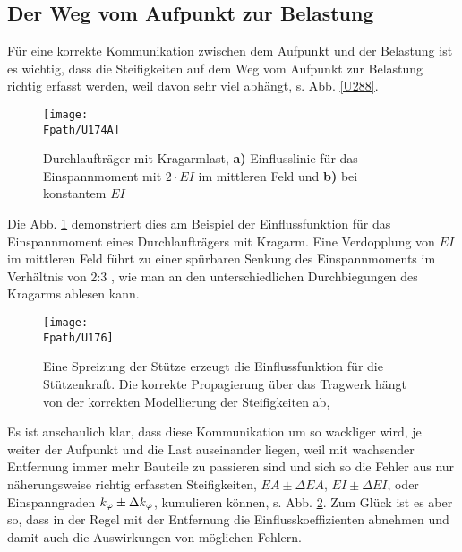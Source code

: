 {\textcolor{sectionTitleBlue}{\section{Der Weg vom Aufpunkt zur Belastung}}}
F\"{u}r eine korrekte Kommunikation zwischen dem Aufpunkt und der Belas\-tung ist es wichtig, dass die Steifigkeiten auf dem Weg vom Aufpunkt zur Belastung richtig erfasst werden, weil davon sehr viel abh\"{a}ngt, s. Abb. \ref{U288}.
\begin{figure}
\centering
\if {} \sidecaption \fi
\texttt{[image: \\Fpath/U174A]}
\caption{Durchlauftr\"{a}ger mit Kragarmlast, \textbf{ a)} Einflusslinie f\"{u}r das Einspannmoment mit $2 \cdot EI$ im mittleren Feld  und \textbf{ b)} bei konstantem $EI$}
\label{U174}%
\end{figure}%

Die Abb. \ref{U174} demonstriert dies am Beispiel der Einflussfunktion f\"{u}r das Einspannmoment eines Durchlauftr\"{a}gers mit Kragarm. Eine Verdopplung von $EI$ im mittleren Feld f\"{u}hrt zu einer sp\"{u}rbaren Senkung des Einspannmoments im Verh\"{a}ltnis von 2:3 , wie man an den unterschiedlichen Durchbiegungen des Kragarms ablesen kann.
\begin{figure}
\centering
\if {} \sidecaption \fi
\texttt{[image: \\Fpath/U176]}
\caption{Eine Spreizung der St\"{u}tze erzeugt die Einflussfunktion f\"{u}r die St\"{u}tzenkraft. Die korrekte Propagierung \"{u}ber das Tragwerk h\"{a}ngt von der korrekten Modellierung der Steifigkeiten ab, \cite{Sof}}
\label{U176}%
\end{figure}%

Es ist anschaulich klar, dass diese Kommunikation um so \glq wackliger\grq{} wird, je weiter der Aufpunkt und die Last auseinander liegen, weil mit wachsender Entfernung immer mehr Bauteile zu passieren sind und sich so die Fehler aus nur n\"{a}herungsweise richtig erfassten Steifigkeiten, $EA \pm \Delta EA$, $EI \pm \Delta EI$, oder Einspanngraden $k_\varphi \pm \Delta k_\varphi$, kumulieren k\"{o}nnen, s. Abb. \ref{U176}. Zum Gl\"{u}ck ist es aber so, dass in der Regel mit der Entfernung die Einflusskoeffizienten abnehmen und damit auch die Auswirkungen von m\"{o}glichen Fehlern.

